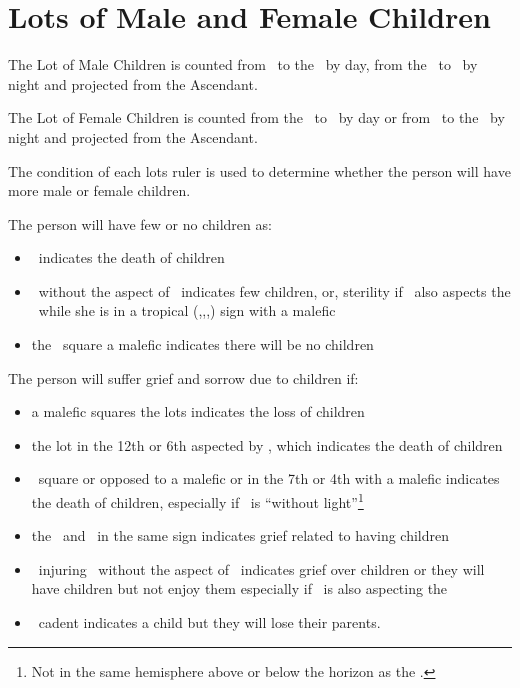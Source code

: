 \section{Lots of Male and Female Children}
The Lot of Male Children is counted from \Jupiter\, to the \Sun\, by day, from the \Sun\, to \Jupiter\, by night and projected from the Ascendant.

The Lot of Female Children is counted from the \Moon\, to \Venus\, by day or from \Venus\, to the \Moon\, by night and projected from the Ascendant.

The condition of each lots ruler is used to determine whether the person will have more male or female children.

The person will have few or no children as:
\begin{itemize}[topsep=0em,itemsep=0em]
\item \Saturn\Opposition\Mercury\, indicates the death of children
\item \Venus\Opposition\Saturn\, without the aspect of \Jupiter\, indicates few children, or, sterility if \Saturn\, also aspects the \Moon\, while she is in a tropical (\Aries,\Cancer,\Libra,\Capricorn) sign with a malefic
\item the \Moon\, square a malefic indicates there will be no children
\end{itemize}

The person will suffer grief and sorrow due to children if:
\begin{itemize}[topsep=0em,itemsep=0em]
\item a malefic squares the lots indicates the loss of children
\item the lot in the 12th or 6th aspected by \Saturn, which indicates the death of children
\item \Jupiter\, square or opposed to a malefic or in the 7th or 4th with a malefic indicates the death of children, especially if \Jupiter\, is ``without light''\footnote{Not in the same hemisphere above or below the horizon as the \Sun.}
\item the \Sun\, and \Saturn\, in the same sign indicates grief related to having children
\item \Saturn\, injuring \Venus\, without the aspect of \Jupiter\, indicates grief over children or they will have children but not enjoy them especially if \Saturn\, is also aspecting the \Moon
\item \Jupiter\, cadent indicates a child but they will lose their parents.
\end{itemize}

